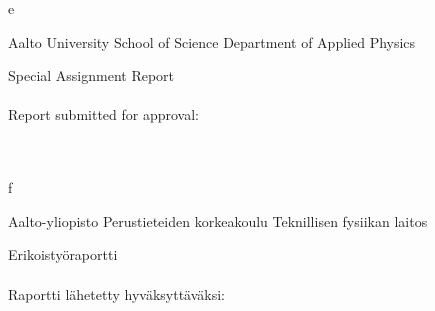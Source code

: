 \begin{titlepage}

{\sffamily

\if\mylang e

\noindent
\fontsize{12}{14}\selectfont
Aalto University \newline
School of Science \newline
Department of Applied Physics

\vspace{40mm}

\noindent
\fontsize{14}{16}\selectfont
\myauthor

\vspace{10mm}

\noindent
\fontsize{18}{22}\selectfont
\textbf{\mytitle}

\vspace{90mm}

\noindent
\fontsize{12}{14}\selectfont
Special Assignment Report \\[4mm]
\mycourse \\[4mm]
Report submitted for approval: \mypubdate \\[4mm]
\mbox{}\\[4mm]
 \mysupervisor \\[4mm]
 \myinstructor

\fi

\if\mylang f

\noindent
\fontsize{12}{14}\selectfont
Aalto-yliopisto \newline
Perustieteiden korkeakoulu \newline
Teknillisen fysiikan laitos

\vspace{40mm}

\noindent
\fontsize{14}{16}\selectfont
\myauthor

\vspace{10mm}

\noindent
\fontsize{18}{22}\selectfont
\textbf{\mytitle}

\vspace{90mm}

\noindent
\fontsize{12}{14}\selectfont
Erikoistyöraportti \\[4mm]
\mycourse \\[4mm]
Raportti lähetetty hyväksyttäväksi: \mypubdate \\[4mm]
\mbox{}\\[4mm]
 \mysupervisor \\[4mm]
 \myinstructor

}
\end{titlepage}
